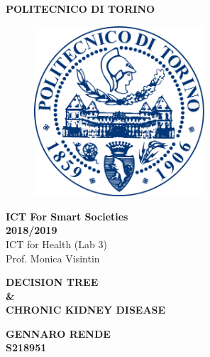 \documentclass[10pt]{article}
\begin{document}

\begin{center}
\textbf{\Huge POLITECNICO DI TORINO}
\vspace{0.08in}

\begin{figure}[H]
  \centering
  \includegraphics[width=2.5in]{poli.png}
\end{figure}

\end{center}
\begin{center}
\vspace{0.05in}
\Large\textbf{ICT For Smart Societies}\\
\vspace{0.08in}
\Large\textbf{2018/2019}\\
\vspace{0.1in}
\Large ICT for Health (Lab 3)\\
\large Prof. Monica Visintin
\end{center}
\begin{center}
\vspace{0.5in}
\end{center}



\begin{center}
\textbf{\Huge DECISION TREE\\ \& \\ CHRONIC KIDNEY DISEASE\\}
\end{center}


\begin{center}
\vspace{1.5in}
\textbf{\Large GENNARO RENDE}\\
\textbf{S218951}\\
\end{center}


\pagebreak
\end{document}
